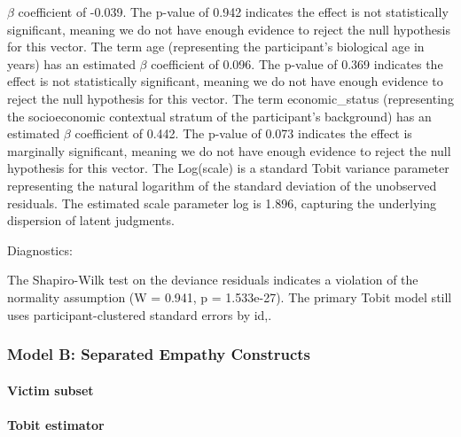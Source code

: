 \documentclass[11pt]{article}
\begin{document}
$\beta$ coefficient of -0.039. The p-value of 0.942 indicates the effect is not statistically significant, meaning we do not have enough evidence to reject the null hypothesis for this vector. The term age (representing the participant's biological age in years) has an estimated $\beta$ coefficient of 0.096. The p-value of 0.369 indicates the effect is not statistically significant, meaning we do not have enough evidence to reject the null hypothesis for this vector. The term economic\_status (representing the socioeconomic contextual stratum of the participant's background) has an estimated $\beta$ coefficient of 0.442. The p-value of 0.073 indicates the effect is marginally significant, meaning we do not have enough evidence to reject the null hypothesis for this vector. The Log(scale) is a standard Tobit variance parameter representing the natural logarithm of the standard deviation of the unobserved residuals. The estimated scale parameter log is 1.896, capturing the underlying dispersion of latent judgments.

Diagnostics:

The Shapiro-Wilk test on the deviance residuals indicates a violation of the normality assumption (W = 0.941, p = 1.533e-27). The primary Tobit model still uses participant-clustered standard errors by id,.


\subsubsection{Model B: Separated Empathy Constructs}
\paragraph{Victim subset}

\paragraph{Tobit estimator}
\end{document}
